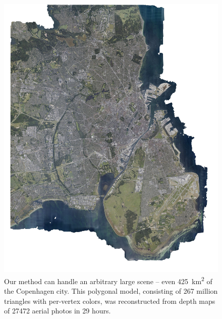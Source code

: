 \documentclass[10pt,letterpaper]{article}
\begin{document}
\begin{figure}[H]
    \centering
    \capstart
    \begin{minipage}[b]{1.0\linewidth}
        \includegraphics[width=\textwidth]{images/copenhagen/results/full/full_rgb.jpg}
    \end{minipage}
    \caption{Our method can handle an arbitrary large scene -- even \SI{425}{\km\squared} of the Copenhagen city.
    This polygonal model, consisting of 267 million triangles with per-vertex colors, was reconstructed from depth maps of 27472 aerial photos in 29 hours.}
    \label{fig:copenhagen_full_rgb}
\end{figure}
\end{document}
